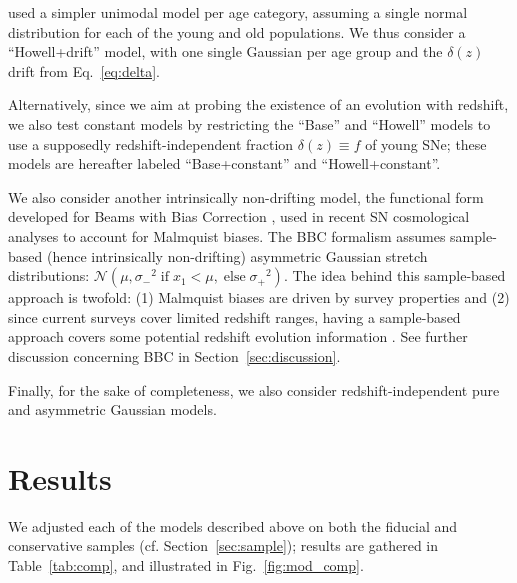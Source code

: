 \documentclass[]{aa}
\begin{document}
\cite{howell2007} used a simpler unimodal model per age category, assuming a
single normal distribution for each of the young and old populations. We thus
consider a ``Howell+drift'' model, with one single Gaussian per age group and
the $\delta(z)$ drift from Eq.~\ref{eq:delta}.

Alternatively, since we aim at probing the existence of an evolution with
redshift, we also test constant models by restricting the ``Base'' and
``Howell'' models to use a supposedly redshift-independent fraction $\delta(z)
\equiv f$ of young SNe; these models are hereafter labeled ``Base+constant'' and
``Howell+constant''.

We also consider another intrinsically non-drifting model, the functional form
developed for Beams with Bias Correction \cite[BBC,][]{scolnic2016,
kessler2017}, used in recent SN cosmological analyses
\cite[e.g.][]{scolnic2018a, descosmopaper2019, riess2016, riess2019} to account
for Malmquist biases. The BBC formalism assumes sample-based (hence
intrinsically non-drifting) asymmetric Gaussian stretch distributions:
$\mathcal{N}\left(\mu, \sigma_-{}^2\; \text{if} \;x_1<\mu,\; \text{else}
\;\sigma_+{}^2\right)$. The idea behind this sample-based approach is twofold:
(1) Malmquist biases are driven by survey properties and (2) since current
surveys cover limited redshift ranges, having a sample-based approach covers
some potential redshift evolution information \citep{scolnic2016, scolnic2018a}.
See further discussion concerning BBC in Section~\ref{sec:discussion}. 

Finally, for the sake of completeness, we also consider redshift-independent
pure and asymmetric Gaussian models. 

\section{Results}\label{sec:results}

We adjusted each of the models described above on both the fiducial and
conservative samples (cf. Section~\ref{sec:sample}); results are gathered
in Table~\ref{tab:comp}, and illustrated in Fig.~\ref{fig:mod_comp}. 
\end{document}
